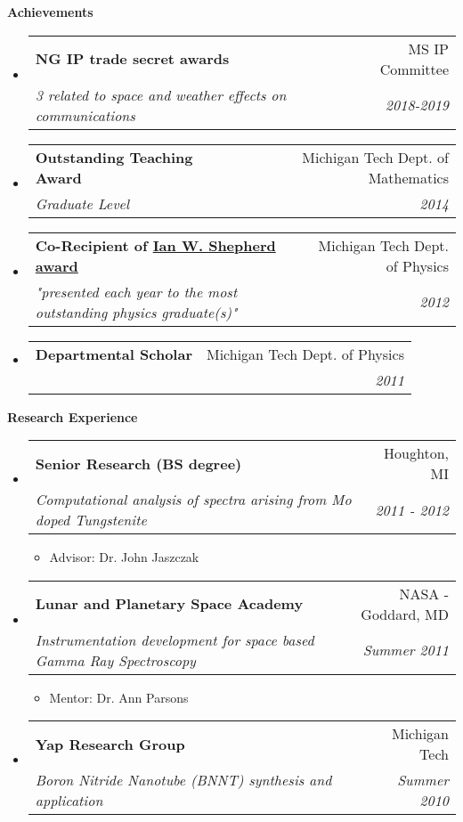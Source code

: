 \documentclass[letterpaper,11pt]{article}
\makeatletter
\newcommand{\resitem}[1]{\item #1 \vspace{-2pt}}
\newcommand{\resheading}[1]{{\large \textbf{#1}}}
\newcommand{\ressubheading}[4]{
\begin{tabular*}{6.5in}{l@{\extracolsep{\fill}}r}
		\textbf{#1} & #2 \\
		\textit{#3} & \textit{#4} \\
\end{tabular*}\vspace{-6pt}}
\makeatother
\begin{document}
\newpage
\resheading{Achievements}
\begin{itemize}
\item
\ressubheading{NG IP trade secret awards}{MS IP Committee}{3 related to space and weather effects on communications}{2018-2019}
\item
\ressubheading{Outstanding Teaching Award}{Michigan Tech Dept. of Mathematics}{Graduate Level}{2014}
\item
\ressubheading{Co-Recipient of \href{http://www.mtu.edu/physics/department/profile/awards/shepherd.html}{Ian W. Shepherd award}}{Michigan Tech Dept. of Physics}{"presented each year to the most outstanding physics graduate(s)"}{2012}
\item
\ressubheading{Departmental Scholar}{Michigan Tech Dept. of Physics}{}{2011}

\end{itemize}

\resheading{Research Experience}
\begin{itemize}
\item%
	\ressubheading{Senior Research (BS degree)}{Houghton, MI}{Computational analysis of spectra arising from Mo doped Tungstenite}{2011 - 2012}
	{\footnotesize
	\begin{itemize}
		\resitem{Advisor: Dr. John Jaszczak}
	\end{itemize}
	}
\item%
	\ressubheading{Lunar and Planetary Space Academy}{NASA - Goddard, MD}{Instrumentation development for space based Gamma Ray Spectroscopy}{Summer 2011}
	{\footnotesize
	\begin{itemize}
		\resitem{Mentor: Dr. Ann Parsons}
	\end{itemize}
	}
\item%
	\ressubheading{Yap Research Group}{Michigan Tech}{Boron Nitride Nanotube (BNNT) synthesis and application}{Summer 2010}
\end{itemize}
\end{document}
